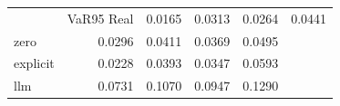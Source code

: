 \begin{tabular}{lrrrr}
\toprule
 & VaR95%
\midrule
Real & 0.0165 & 0.0313 & 0.0264 & 0.0441 \\
zero & 0.0296 & 0.0411 & 0.0369 & 0.0495 \\
explicit & 0.0228 & 0.0393 & 0.0347 & 0.0593 \\
llm & 0.0731 & 0.1070 & 0.0947 & 0.1290 \\
\bottomrule
\end{tabular}
